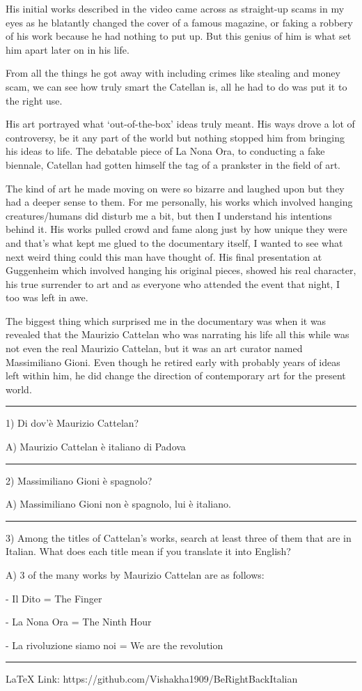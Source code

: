 \documentclass{article}
\begin{document}
His initial works described in the video came across as straight-up scams in my eyes as he blatantly changed the cover of a famous magazine, or faking a robbery of his work because he had nothing to put up. But this genius of him is what set him apart later on in his life.

From all the things he got away with including crimes like stealing and money scam, we can see how truly smart the Catellan is, all he had to do was put it to the right use.

His art portrayed what ‘out-of-the-box’ ideas truly meant. His ways drove a lot of controversy, be it any part of the world but nothing stopped him from bringing his ideas to life. The debatable piece of La Nona Ora, to conducting a fake biennale, Catellan had gotten himself the tag of a prankster in the field of art. 

The kind of art he made moving on were so bizarre and laughed upon but they had a deeper sense to them. For me personally, his works which involved hanging creatures/humans did disturb me a bit, but then I understand his intentions behind it. His works pulled crowd and fame along just by how unique they were and that’s what kept me glued to the documentary itself, I wanted to see what next weird thing could this man have thought of. His final presentation at Guggenheim which involved hanging his original pieces, showed his real character, his true surrender to art and as everyone who attended the event that night, I too was left in awe. 

The biggest thing which surprised me in the documentary was when it was revealed that the Maurizio Cattelan who was narrating his life all this while was not even the real Maurizio Cattelan, but it was an art curator named Massimiliano Gioni. Even though he retired early with probably years of ideas left within him, he did change the direction of contemporary art for the present world. 



\noindent\rule{\linewidth}{1pt} \par
1) Di dov'è Maurizio Cattelan?

A) Maurizio Cattelan è italiano di Padova

\noindent\rule{\linewidth}{1pt} \par
2) Massimiliano Gioni è spagnolo?

A) Massimiliano Gioni non è spagnolo, lui è italiano.

\noindent\rule{\linewidth}{1pt} \par
3) Among the titles of Cattelan's works, search at least three of them that are in Italian. What does each title mean if you translate it into English?

A)  3 of the many works by Maurizio Cattelan are as follows:

- Il Dito = The Finger

- La Nona Ora = The Ninth Hour

- La rivoluzione siamo noi = We are the revolution

\noindent\rule{\linewidth}{1pt} \par

LaTeX Link: https://github.com/Vishakha1909/BeRightBackItalian
\end{document}
